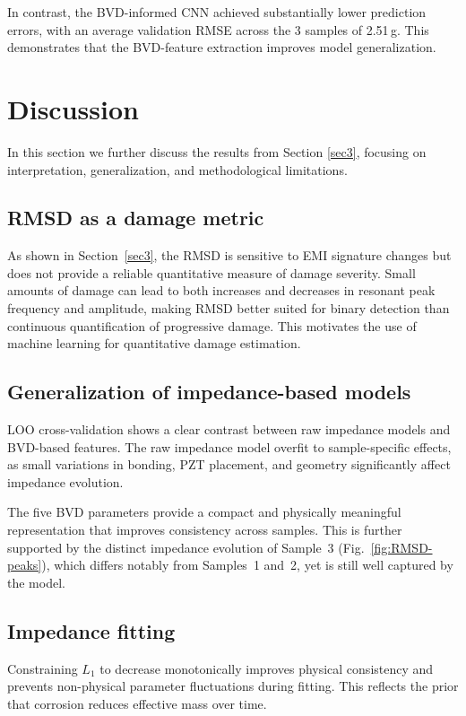 \documentclass[journal,twoside,web]{ieeecolor}
\begin{document}
In contrast, the BVD-informed CNN achieved substantially lower prediction errors, with an average validation RMSE across the 3 samples of 2.51\,g. This demonstrates that the BVD-feature extraction improves model generalization. 


\section{Discussion}\label{sec4}

In this section we further discuss the results from Section \ref{sec3}, focusing on interpretation, generalization, and methodological limitations.

\subsection{RMSD as a damage metric}

As shown in Section~\ref{sec3}, the RMSD is sensitive to EMI signature changes but does not provide a reliable quantitative measure of damage severity. Small amounts of damage can lead to both increases and decreases in resonant peak frequency and amplitude, making RMSD better suited for binary detection than continuous quantification of progressive damage. This motivates the use of machine learning for quantitative damage estimation.

\subsection{Generalization of impedance-based models}

LOO cross-validation shows a clear contrast between raw impedance models and BVD-based features. The raw impedance model overfit to sample-specific effects, as small variations in bonding, PZT placement, and geometry significantly affect impedance evolution.

The five BVD parameters provide a compact and physically meaningful representation that improves consistency across samples. This is further supported by the distinct impedance evolution of Sample~3 (Fig.~\ref{fig:RMSD-peaks}), which differs notably from Samples~1 and~2, yet is still well captured by the model.


\subsection{Impedance fitting}

Constraining $L_1$ to decrease monotonically improves physical consistency and prevents non-physical parameter fluctuations during fitting. This reflects the prior that corrosion reduces effective mass over time.
\end{document}
